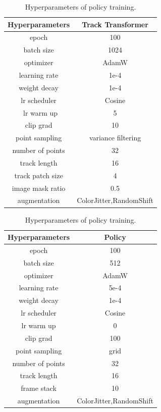 \begin{table}[ht]
\begin{minipage}[c]{0.48\textwidth}
\makeatletter{}
\centering
\caption{Hyperparameters of track transformer training.}
\begin{tabular}{@{}cc@{}}
    \toprule
    Hyperparameters & Track Transformer \\
    \midrule
    epoch & 100  \\
    batch size &  1024  \\
    optimizer & AdamW  \\
    learning rate & 1e-4  \\
    weight decay & 1e-4 \\
    lr scheduler & Cosine  \\\
    lr warm up & 5 \\
    clip grad & 10 \\
    point sampling & variance filtering \\
    number of points & 32 \\
    track length & 16 \\
    track patch size & 4 \\
    image mask ratio & 0.5 \\
    augmentation & ColorJitter,RandomShift \\
    \bottomrule
\end{tabular}
\label{tab:tt-hyperparameter}
\end{minipage}
\begin{minipage}[c]{0.48\textwidth}
\makeatletter{}
\centering
  \caption{Hyperparameters of policy training.}
  \begin{tabular}{@{}cc@{}}
    \toprule
    Hyperparameters & Policy  \\
    \midrule
    epoch & 100  \\
    batch size &  512  \\
    optimizer &  AdamW  \\
    learning rate & 5e-4  \\
    weight decay & 1e-4 \\
    lr scheduler & Cosine  \\
    lr warm up & 0 \\
    clip grad & 100 \\
    point sampling & grid \\
    number of points & 32 \\
    track length & 16 \\
    frame stack & 10 \\
    augmentation & ColorJitter,RandomShift \\
    \bottomrule
  \end{tabular}
  \label{tab:policy-hyperparameter}
\end{minipage}
\end{table}


